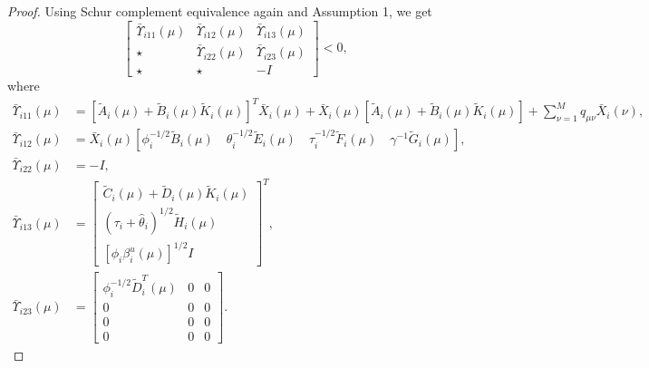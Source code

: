 \documentclass[11pt,draftcls,onecolumn]{IEEEtran}
\begin{document}
\begin{proof}
Using Schur complement equivalence again and Assumption 1, we get
\begin{equation}
\left[
\begin{array}{cccc}
\bar{\Upsilon}_{i11}(\mu) & \bar{\Upsilon}_{i12}(\mu) & \bar{\Upsilon}_{i13}(\mu)\\
\star & \bar{\Upsilon}_{i22}(\mu) & \bar{\Upsilon}_{i23}(\mu)   \\
\star & \star & -I
\end{array}
\right]<0,
\end{equation}
where
\begin{align*}
\bar{\Upsilon}_{i11}(\mu)&=\left[\tilde{A}_i(\mu)+\tilde{B}_i(\mu)\tilde{K}_i(\mu)\right]^T\bar{X}_i(\mu)+\bar{X}_i(\mu)\left[\tilde{A}_i(\mu)+\tilde{B}_i(\mu)\tilde{K}_i(\mu)\right]+\sum_{\nu=1}^Mq_{\mu\nu}\bar{X}_i(\nu),\\
\bar{\Upsilon}_{i12}(\mu)&= \bar{X}_i(\mu)\left[\phi_i^{-1/2}\tilde{B}_i(\mu) \quad\theta_i^{-1/2}\tilde{E}_i(\mu) \quad \tau_i^{-1/2}\tilde{F}_i(\mu) \quad  \gamma^{-1}\tilde{G}_i(\mu)\right],\\
\bar{\Upsilon}_{i22}(\mu)&= - I,\\
\bar{\Upsilon}_{i13}(\mu)&=\begin{bmatrix}
\tilde{C}_i(\mu)+\tilde{D}_i(\mu)\tilde{K}_i(\mu) \\ (\tau_i+\hat{\theta}_i)^{1/2}\tilde{H}_i(\mu) \\ [\phi_i\beta_i^u(\mu)]^{1/2}I
\end{bmatrix}^T,\\
\bar{\Upsilon}_{i23}(\mu)&=\begin{bmatrix}
\phi_i^{-1/2}\tilde{D}_i^T(\mu) & 0& 0\\
0 & 0 &  0 \\
0  & 0  & 0  \\
0  & 0  & 0
\end{bmatrix}.
\end{align*}


\end{proof}
\end{document}
